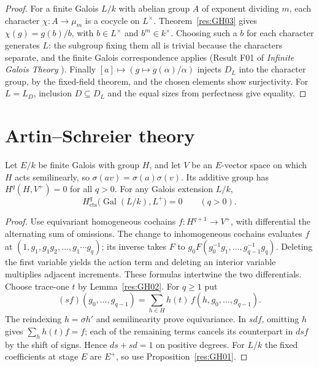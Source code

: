 \begin{proof}
For a finite Galois \(L/k\) with abelian group \(A\) of exponent
dividing \(m\), each character \(\chi:A\to\mu_m\) is a cocycle on
\(L^\times\). Theorem~\ref{res:GH03} gives \(\chi(g)=g(b)/b\), with
\(b\in L^\times\) and \(b^m\in k^\times\). Choosing such a \(b\) for
each character generates \(L\): the subgroup fixing them all is
trivial because the characters separate, and the finite Galois
correspondence applies (Result F01 of \emph{Infinite Galois Theory}
\cite[PDF p.~4]{mg-aft}). Finally \([a]\mapsto(g\mapsto g(\alpha)/\alpha)\)
injects \(D_L\) into the character group, by the fixed-field theorem,
and the chosen elements show surjectivity. For \(L=L_D\), inclusion
\(D\subseteq D_L\) and the equal sizes from perfectness give equality.
\end{proof}

\section{Artin--Schreier theory}

\begin{proposition}
\label{res:GH08}
Let \(E/k\) be finite Galois with group \(H\), and let \(V\) be an
\(E\)-vector space on which \(H\) acts semilinearly, so
\(\sigma(av)=\sigma(a)\sigma(v)\). Its additive group has
\(H^q(H,V^+)=0\) for all \(q>0\). For any Galois extension \(L/k\),
\[
 H^q_{\mathrm{cts}}\bigl(\operatorname{Gal}(L/k),L^+\bigr)=0
 \qquad(q>0).
\]
\end{proposition}
\begin{proof}
Use equivariant homogeneous cochains \(f:H^{q+1}\to V^+\),
with differential the alternating sum of omissions.
The change to inhomogeneous cochains evaluates \(f\) at
\((1,g_1,g_1g_2,\ldots,g_1\cdots g_q)\); its inverse takes
\(F\) to \(g_0 F(g_0^{-1}g_1,\ldots,g_{q-1}^{-1}g_q)\).
Deleting the first variable yields the action term and deleting
an interior variable multiplies adjacent increments. These formulas
intertwine the two differentials.
Choose trace-one \(t\) by Lemma~\ref{res:GH02}. For \(q\geq1\) put
\[
 (s f)(g_0,\ldots,g_{q-1})
   =\sum_{h\in H}h(t)\,f(h,g_0,\ldots,g_{q-1}).
\]
The reindexing \(h=\sigma h'\) and semilinearity prove
equivariance. In \(s d f\), omitting \(h\) gives
\(\sum_h h(t)f=f\); each of the remaining terms cancels its
counterpart in \(d s f\) by the shift of signs. Hence \(d s+s d=1\)
on positive degrees. For \(L/k\) the fixed coefficients at stage
\(E\) are \(E^+\), so use Proposition~\ref{res:GH01}.
\end{proof}

